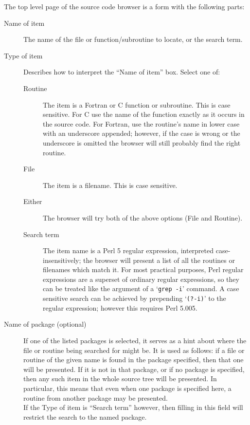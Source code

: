\documentclass[twoside,11pt]{article}
\renewcommand{\_}{\texttt{\symbol{95}}}
\begin{document}
The top level page of the source code browser is a form
with the following parts:
\begin{description}
\item[Name of item]
The name of the file or function/subroutine to locate, or the search term.
\item[Type of item]
Describes how to interpret the ``Name of item'' box.  Select one of:
\begin{description}
   \item[Routine]
   The item is a Fortran or C function or subroutine.
   This is case sensitive.
   For C use the name of the function exactly as it occurs in the source code.
   For Fortran, use the routine's name in lower case with an 
   underscore appended;
   however, if the case is wrong or the underscore is omitted the 
   browser will still probably 
   find the right routine.
   \item[File]
   The item is a filename.  This is case sensitive.
   \item[Either]
   The browser will try both of the above options (File and Routine).
   \item[Search term]
   The item name is a Perl 5 regular expression, 
   interpreted case-insensitively;
   the browser will present a list of all the routines or filenames 
   which match it.
   For most practical purposes, Perl regular expressions are a superset
   of ordinary regular expressions, so they can be treated like the 
   argument of a `{\tt grep -i}' command.
   A case sensitive search can be achieved by prepending `{\tt (?-i)}' to the
   regular expression; however this requires Perl 5.005.
\end{description}
\item[Name of package (optional)]
If one of the listed packages is selected, it serves
as a hint about where the file or routine being searched for might be.
It is used as follows: if a file or routine of the given name is found
in the package specified, then that one will be presented.
If it is not in that package, or if no package is specified, 
then any such item in the whole source tree will be presented.
In particular, this means that even when one package is specified here,
a routine from another package may be presented.\\
If the Type of item is ``Search term'' however, then filling in this
field will restrict the search to the named package.
\end{description}
\end{document}
